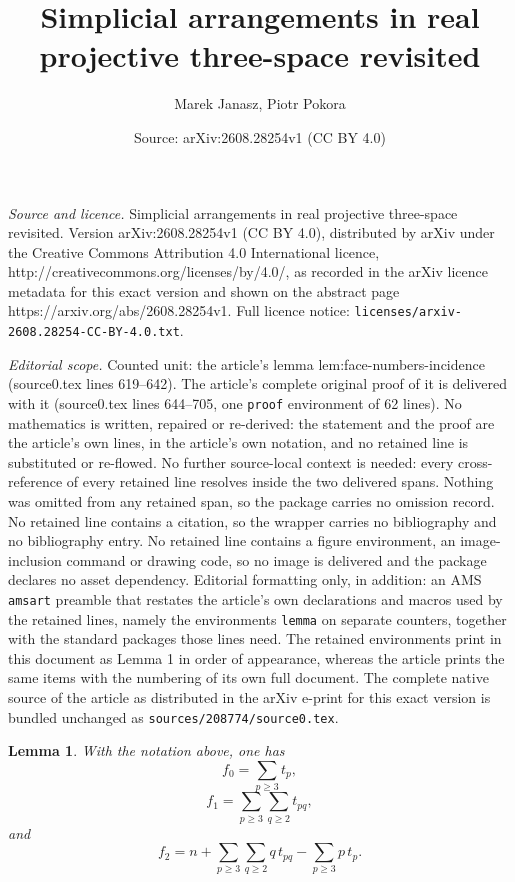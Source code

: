 \documentclass[10pt,a4paper]{amsart}
\title{Simplicial arrangements in real projective three-space revisited}
\author{Marek Janasz, Piotr Pokora}
\date{Source: arXiv:2608.28254v1 (CC BY 4.0)}
\newtheorem{lemma}{Lemma}
\begin{document}
\maketitle

\noindent\emph{Source and licence.} Simplicial arrangements in real projective three-space revisited. Version arXiv:2608.28254v1 (CC BY 4.0), distributed by arXiv under the Creative Commons Attribution 4.0 International licence, http://creativecommons.org/licenses/by/4.0/, as recorded in the arXiv licence metadata for this exact version and shown on the abstract page https://arxiv.org/abs/2608.28254v1. Full licence notice: \texttt{licenses/arxiv-2608.28254-CC-BY-4.0.txt}.\par\smallskip

\noindent\textit{Editorial scope.} Counted unit: the article's lemma lem:face-numbers-incidence (source0.tex lines 619--642). The article's complete original proof of it is delivered with it (source0.tex lines 644--705, one \texttt{proof} environment of 62 lines). No mathematics is written, repaired or re-derived: the statement and the proof are the article's own lines, in the article's own notation, and no retained line is substituted or re-flowed.  No further source-local context is needed: every cross-reference of every retained line resolves inside the two delivered spans.  Nothing was omitted from any retained span, so the package carries no omission record.  No retained line contains a citation, so the wrapper carries no bibliography and no bibliography entry.  No retained line contains a figure environment, an image-inclusion command or drawing code, so no image is delivered and the package declares no asset dependency.  Editorial formatting only, in addition: an AMS \texttt{amsart} preamble that restates the article's own declarations and macros used by the retained lines, namely the environments \texttt{lemma} on separate counters, together with the standard packages those lines need.  The retained environments print in this document as Lemma 1 in order of appearance, whereas the article prints the same items with the numbering of its own full document.  The complete native source of the article as distributed in the arXiv e-print for this exact version is bundled unchanged as \texttt{sources/208774/source0.tex}.
\begin{lemma}
\label{lem:face-numbers-incidence}
With the notation above, one has
\[
f_0
=
\sum_{p\geq 3}t_p,
\]
\[
f_1
=
\sum_{p\geq 3}\sum_{q\geq 2}t_{pq},
\]
and
\[
f_2
=
n
+
\sum_{p\geq 3}\sum_{q\geq 2}q\,t_{pq}
-
\sum_{p\geq 3}p\,t_p.
\]
\end{lemma}
\end{document}
